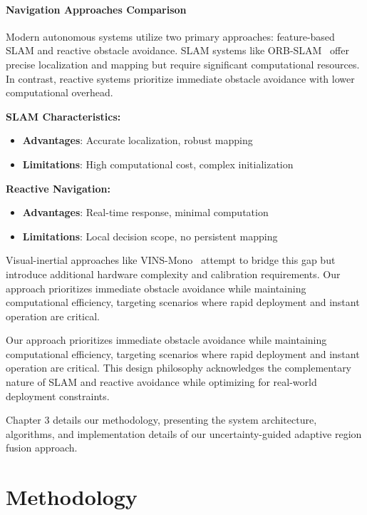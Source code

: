 \documentclass[12pt,oneside]{book}
\begin{document}
\subsubsection{Navigation Approaches Comparison}
Modern autonomous systems utilize two primary approaches: feature-based SLAM and reactive obstacle avoidance. SLAM systems like ORB-SLAM~\cite{mur2015orb} offer precise localization and mapping but require significant computational resources. In contrast, reactive systems prioritize immediate obstacle avoidance with lower computational overhead.

\textbf{SLAM Characteristics:}
\begin{itemize}
    \item \textbf{Advantages}: Accurate localization, robust mapping
    \item \textbf{Limitations}: High computational cost, complex initialization
\end{itemize}

\textbf{Reactive Navigation:}
\begin{itemize}
    \item \textbf{Advantages}: Real-time response, minimal computation
    \item \textbf{Limitations}: Local decision scope, no persistent mapping
\end{itemize}

Visual-inertial approaches like VINS-Mono~\cite{qin2018vins} attempt to bridge this gap but introduce additional hardware complexity and calibration requirements. Our approach prioritizes immediate obstacle avoidance while maintaining computational efficiency, targeting scenarios where rapid deployment and instant operation are critical.

Our approach prioritizes immediate obstacle avoidance while maintaining computational efficiency, targeting scenarios where rapid deployment and instant operation are critical. This design philosophy acknowledges the complementary nature of SLAM and reactive avoidance while optimizing for real-world deployment constraints.

\vspace{12pt}
Chapter 3 details our methodology, presenting the system architecture, algorithms, and implementation details of our uncertainty-guided adaptive region fusion approach.

\chapter{Methodology}
\end{document}

